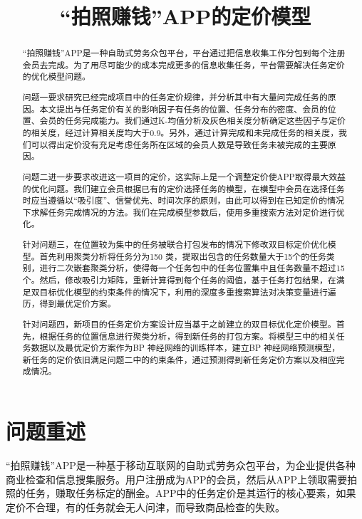 \documentclass[withoutpreface,bwprint]{cumcmthesis} %
\title{“拍照赚钱”APP的定价模型}
\begin{document}
\maketitle
\begin{abstract}
    “拍照赚钱”APP是一种自助式劳务众包平台，平台通过把信息收集工作分包到每个注册会员去完成。为了用尽可能少的成本完成更多的信息收集任务，平台需要解决任务定价的优化模型问题。

    问题一要求研究已经完成项目中的任务定价规律，并分析其中有大量问完成任务的原因。本文提出与任务定价有关的影响因子有任务的位置、任务分布的密度、会员的位置、会员的任务完成能力。我们通过K-均值分析及灰色相关度分析确定这些因子与定价的相关度，经过计算相关度均大于0.9。另外，通过计算完成和未完成任务的相关度，我们可以得出定价没有充足考虑任务所在区域的会员人数是导致任务未被完成的主要原因。

    问题二进一步要求改进这一项目的定价，这实际上是一个调整定价使APP取得最大效益的优化问题。我们建立会员根据已有的定价选择任务的模型，在模型中会员在选择任务时应当遵循以“吸引度”、信誉优先、时间次序的原则，由此可以得到在已知定价的情况下求解任务完成情况的方法。我们在完成模型参数后，使用多重搜索方法对定价进行优化。

    针对问题三，在位置较为集中的任务被联合打包发布的情况下修改双目标定价优化模型。首先利用聚类分析将任务分为150 类，提取出包含的任务数量大于15个的任务类别，进行二次嵌套聚类分析，使得每一个任务包中的任务位置集中且任务数量不超过15个。然后，修改吸引力矩阵，重新计算得到每个任务的阈值，基于任务打包结果，在满足双目标优化模型的约束条件的情况下，利用的深度多重搜索算法对决策变量进行遍历，得到最优定价方案。

    针对问题四，新项目的任务定价方案设计应当基于之前建立的双目标优化定价模型。首先，根据任务的位置信息进行聚类分析，得到新任务的打包方案。将模型三中的相关任务数据以及最优定价方案作为BP 神经网络的训练样本，建立BP 神经网络预测模型，新任务的定价依旧满足问题二中的约束条件，通过预测得到新任务定价方案以及相应完成情况。

\end{abstract}
\section{问题重述}
“拍照赚钱”APP是一种基于移动互联网的自助式劳务众包平台，为企业提供各种商业检查和信息搜集服务。用户注册成为APP的会员，然后从APP上领取需要拍照的任务，赚取任务标定的酬金。APP中的任务定价是其运行的核心要素，如果定价不合理，有的任务就会无人问津，而导致商品检查的失败。
\end{document}
